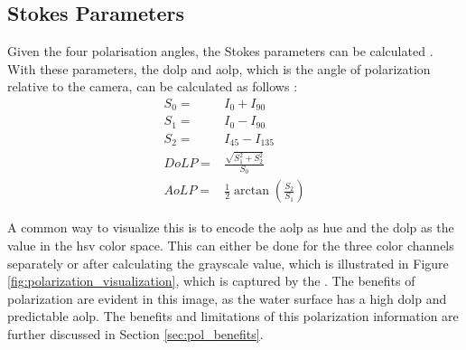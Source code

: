 \subsection{Stokes Parameters}
Given the four polarisation angles, the Stokes parameters can be calculated \cite{piascoSurveyVisualBasedLocalization2018}.
With these parameters, the \gls{dolp} and \gls{aolp}, which is the angle of polarization relative to the camera, can be calculated as follows \cite{piascoSurveyVisualBasedLocalization2018}:
\begin{align}
    S_0 =  & I_0 + I_{90}                                                      \\
    S_1 =  & I_0 - I_{90}                                                      \\
    S_2 =  & I_{45} - I_{135}                                                  \\
    DoLP = & \frac{\sqrt{S_1^2 + S_2^2}}{S_0}  \label{eq:dolp}                 \\
    AoLP = & \frac{1}{2} \arctan{\left(\frac{S_2}{S_1}\right)} \label{eq:aolp}
\end{align}

A common way to visualize this is to encode the \gls{aolp} as hue and the \gls{dolp} as the value in the \gls{hsv} color space.
This can either be done for the three color channels separately or after calculating the grayscale value, which is illustrated in Figure \ref{fig:polarization_visualization}, which is captured by the \sr.
The benefits of polarization are evident in this image, as the water surface has a high \gls{dolp} and predictable \gls{aolp}.
The benefits and limitations of this polarization information are further discussed in Section \ref{sec:pol_benefits}.

